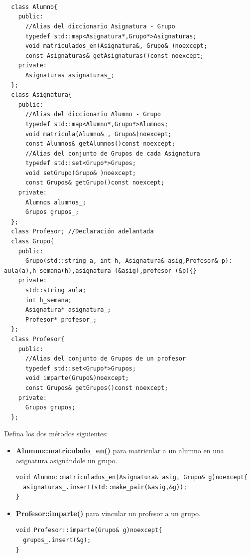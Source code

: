 \begin{verbatim}



  class Alumno{
    public:
      //Alias del diccionario Asignatura - Grupo
      typedef std::map<Asignatura*,Grupo*>Asignaturas;
      void matriculados_en(Asignatura&, Grupo& )noexcept;
      const Asignaturas& getAsignaturas()const noexcept;
    private:
      Asignaturas asignaturas_;
  };
  class Asignatura{
    public:
      //Alias del diccionario Alumno - Grupo
      typedef std::map<Alumno*,Grupo*>Alumnos;
      void matricula(Alumno& , Grupo&)noexcept;
      const Alumnos& getAlumnos()const noexcept;
      //Alias del conjunto de Grupos de cada Asignatura
      typedef std::set<Grupo*>Grupos;
      void setGrupo(Grupo& )noexcept;
      const Grupos& getGrupo()const noexcept;
    private:
      Alumnos alumnos_;
      Grupos grupos_;
  };
  class Profesor; //Declaración adelantada
  class Grupo{
    public:
      Grupo(std::string a, int h, Asignatura& asig,Profesor& p): aula(a),h_semana(h),asignatura_(&asig),profesor_(&p){}
    private:  
      std::string aula;
      int h_semana;
      Asignatura* asignatura_;
      Profesor* profesor_;
  };
  class Profesor{
    public:
      //Alias del conjunto de Grupos de un profesor
      typedef std::set<Grupo*>Grupos;
      void imparte(Grupo&)noexcept;
      const Grupos& getGrupos()const noexcept;
    private:
      Grupos grupos;
  };

\end{verbatim}

 Defina los dos métodos siguientes:

\begin{itemize}
  \item \textbf{Alumno::matriculado\_en()} para matricular a un alumno en una asignatura asignándole un grupo.
\begin{verbatim}
void Alumno::matriculados_en(Asignatura& asig, Grupo& g)noexcept{
  asignaturas_.insert(std::make_pair(&asig,&g));
}
\end{verbatim}
  \item \textbf{Profesor::imparte()} para vincular un profesor a un grupo.
\begin{verbatim}
void Profesor::imparte(Grupo& g)noexcept{
  grupos_.insert(&g);
}
\end{verbatim}
\end{itemize}

